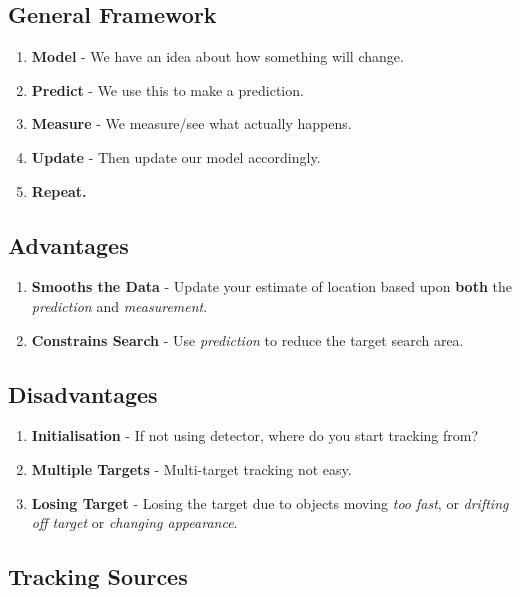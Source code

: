 \documentclass[english, 10pt]{article}
\begin{document}
\subsection{General Framework}

\begin{enumerate}
\item \textbf{Model} - We have an idea about how something will change.
\item \textbf{Predict} - We use this to make a prediction.
\item \textbf{Measure} - We measure/see what actually happens.
\item \textbf{Update} - Then update our model accordingly. 
\item \textbf{Repeat.}
\end{enumerate}

\subsection{Advantages}

\begin{enumerate}
\item \textbf{Smooths the Data} - Update your estimate of location based upon \textbf{both} the \textit{prediction} and \textit{measurement}.
\item \textbf{Constrains Search} - Use \textit{prediction} to reduce the target search area.
\end{enumerate}

\subsection{Disadvantages}

\begin{enumerate}
\item \textbf{Initialisation} - If not using detector, where do you start tracking from?
\item \textbf{Multiple Targets} - Multi-target tracking not easy.
\item \textbf{Losing Target} - Losing the target due to objects moving \textit{too fast}, or \textit{drifting off target} or \textit{changing appearance}.
\end{enumerate}

\subsection{Tracking Sources}
\end{document}
